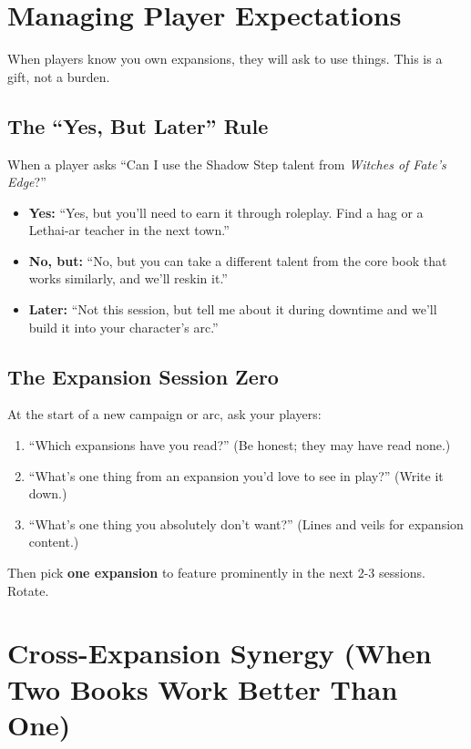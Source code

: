 \section{Managing Player Expectations}

When players know you own expansions, they will ask to use things. This is a gift, not a burden.

\subsection{The “Yes, But Later” Rule}

When a player asks “Can I use the Shadow Step talent from \textit{Witches of Fate's Edge}?”

\begin{itemize}
\item \textbf{Yes:} “Yes, but you'll need to earn it through roleplay. Find a hag or a Lethai-ar teacher in the next town.”
\item \textbf{No, but:} “No, but you can take a different talent from the core book that works similarly, and we'll reskin it.”
\item \textbf{Later:} “Not this session, but tell me about it during downtime and we'll build it into your character's arc.”
\end{itemize}

\subsection{The Expansion Session Zero}

At the start of a new campaign or arc, ask your players:

\begin{enumerate}
\item “Which expansions have you read?” (Be honest; they may have read none.)
\item “What's one thing from an expansion you'd love to see in play?” (Write it down.)
\item “What's one thing you absolutely don't want?” (Lines and veils for expansion content.)
\end{enumerate}

Then pick \textbf{one expansion} to feature prominently in the next 2-3 sessions. Rotate.

\section{Cross-Expansion Synergy (When Two Books Work Better Than One)}

